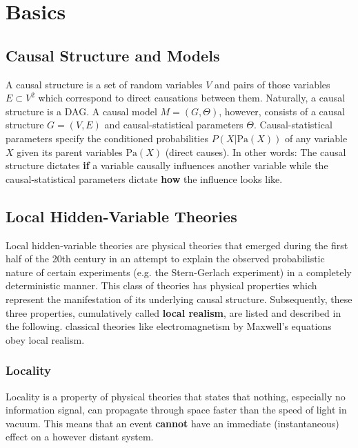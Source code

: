 \chapter{Basics}
\label{Basics}

\section{Causal Structure and Models}
\label{Basics:CausalModels}

A causal structure is a set of random variables $V$ and pairs of those variables $E\subset V^2$ which correspond to direct causations between them.
Naturally, a causal structure is a \ac{DAG}.
A causal model $M=(G,\Theta)$, however, consists of a causal structure $G=(V,E)$ and causal-statistical parameters $\Theta$.
Causal-statistical parameters specify the conditioned probabilities $P(X|\mathrm{Pa}(X))$ of any variable $X$ given its parent variables $\mathrm{Pa}(X)$ (direct causes).
In other words: The causal structure dictates \textbf{if} a variable causally influences another variable while the causal-statistical parameters dictate \textbf{how} the influence looks like. \cite{Wood.2015}

\section{Local Hidden-Variable Theories}
\label{Basics:LocalHiddenVariableTheories}

Local hidden-variable theories are physical theories that emerged during the first half of the 20th century in an attempt to explain the observed probabilistic nature of certain experiments (e.g. the Stern-Gerlach experiment) in a completely deterministic manner.
This class of theories has physical properties which represent the manifestation of its underlying causal structure.
Subsequently, these three properties, cumulatively called \textbf{local realism}, are listed and described in the following.
classical theories like electromagnetism by Maxwell's equations obey local realism.

\subsection{Locality}
\label{Basics:Locality}

Locality is a property of physical theories that states that nothing, especially no information signal, can propagate through space faster than the speed of light in vacuum.
This means that an event \textbf{cannot} have an immediate (instantaneous) effect on a however distant system.

